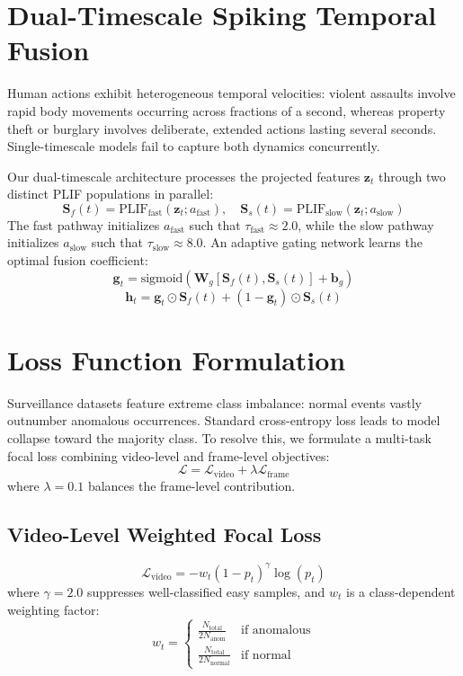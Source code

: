 \documentclass[12pt,a4paper]{report}
\begin{document}
\section{Dual-Timescale Spiking Temporal Fusion}
Human actions exhibit heterogeneous temporal velocities: violent assaults involve rapid body movements occurring across fractions of a second, whereas property theft or burglary involves deliberate, extended actions lasting several seconds. Single-timescale models fail to capture both dynamics concurrently.

Our dual-timescale architecture processes the projected features $\mathbf{z}_t$ through two distinct PLIF populations in parallel:
\begin{equation}
    \mathbf{S}_f(t) = \text{PLIF}_{\text{fast}}(\mathbf{z}_t; a_{\text{fast}}), \quad \mathbf{S}_s(t) = \text{PLIF}_{\text{slow}}(\mathbf{z}_t; a_{\text{slow}})
\end{equation}
The fast pathway initializes $a_{\text{fast}}$ such that $\tau_{\text{fast}} \approx 2.0$, while the slow pathway initializes $a_{\text{slow}}$ such that $\tau_{\text{slow}} \approx 8.0$. An adaptive gating network learns the optimal fusion coefficient:
\begin{equation}
    \mathbf{g}_t = \text{sigmoid}(\mathbf{W}_g [\mathbf{S}_f(t), \mathbf{S}_s(t)] + \mathbf{b}_g)
\end{equation}
\begin{equation}
    \mathbf{h}_t = \mathbf{g}_t \odot \mathbf{S}_f(t) + (1 - \mathbf{g}_t) \odot \mathbf{S}_s(t)
\end{equation}

\section{Loss Function Formulation}
Surveillance datasets feature extreme class imbalance: normal events vastly outnumber anomalous occurrences. Standard cross-entropy loss leads to model collapse toward the majority class. To resolve this, we formulate a multi-task focal loss combining video-level and frame-level objectives:
\begin{equation}
    \mathcal{L} = \mathcal{L}_{\text{video}} + \lambda \mathcal{L}_{\text{frame}}
\end{equation}
where $\lambda = 0.1$ balances the frame-level contribution.

\subsection{Video-Level Weighted Focal Loss}
\begin{equation}
    \mathcal{L}_{\text{video}} = - w_t (1 - p_t)^\gamma \log(p_t)
\end{equation}
where $\gamma = 2.0$ suppresses well-classified easy samples, and $w_t$ is a class-dependent weighting factor:
\begin{equation}
    w_t = \begin{cases} \frac{N_{\text{total}}}{2 N_{\text{anom}}} & \text{if anomalous} \\ \frac{N_{\text{total}}}{2 N_{\text{normal}}} & \text{if normal} \end{cases}
\end{equation}
\end{document}
